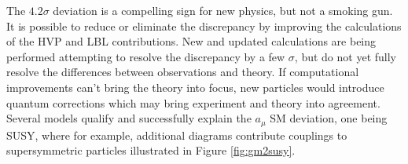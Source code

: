 
The $4.2\sigma$ deviation is a compelling sign for new physics, but not a smoking gun. It is possible to reduce or eliminate the discrepancy by improving the calculations of the HVP and LBL contributions. New and updated calculations are being performed attempting to resolve the discrepancy by a few $\sigma$, but do not yet fully resolve the differences between observations and theory. If computational improvements can't bring the theory into focus, new particles would introduce  quantum corrections which may bring experiment and theory into agreement. Several models qualify and successfully explain the $a_\mu$ SM deviation, one being SUSY, where for example, additional diagrams contribute couplings to supersymmetric particles illustrated in Figure \ref{fig:gm2susy}.

